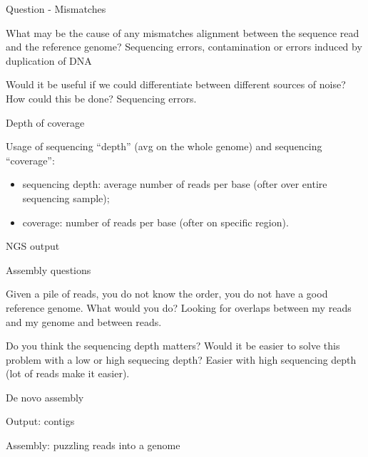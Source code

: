 {Question - Mismatches}

What may be the cause of any mismatches alignment between the sequence read 
and the reference genome? Sequencing errors, contamination or errors induced by 
duplication of DNA


Would it be useful if we could differentiate between different sources of 
noise? How could this be done? Sequencing errors.

{Depth of coverage}

Usage of sequencing ``depth'' (avg on the whole genome) and sequencing ``coverage'': 
\begin{itemize}
\item sequencing depth: average number of reads per base (ofter over entire 
sequencing sample);
\item coverage: number of reads per base (ofter on specific region).
\end{itemize}

{NGS output}


{Assembly questions}

Given a pile of reads, you do not know the order, you do not have a good 
reference genome. What would you do?
Looking for overlaps between my reads and my genome and between reads.

Do you think the sequencing depth matters? Would it be easier to solve this 
problem with a low or high sequecing depth?
Easier with high sequencing depth (lot of reads make it easier).

{De novo assembly}

Output: contigs %

{Assembly: puzzling reads into a genome}

